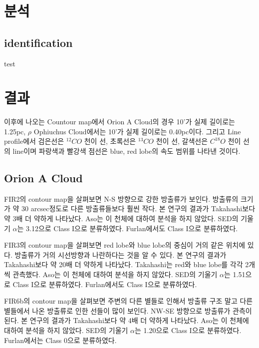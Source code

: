 \section{분석}

\subsection{identification}

test


\section{결과}

이후에 나오는 Countour map에서 Orion A Cloud의 경우 10'가 실제 길이로는 1.25pc, $\rho$ Ophiuchus Cloud에서는 10'가 실제 길이로는 0.40pc이다. 그리고 Line profile에서 검은선은 $^{12}CO$ 천이 선, 초록선은 $^{13}CO$ 천이 선, 갈색선은 $C^{18}O$ 천이 선의 line이며 파랑색과 빨강색 점선은 blue, red lobe의 속도 범위를 나타낸 것이다.


\subsection{Orion A Cloud}



\clearpage
\newpage   
FIR2의 contour map을 살펴보면 N-S 방향으로 강한 방출류가 보인다. 방출류의 크기가 약 30 arcsec정도로 다른 방출류들보다 훨씬 작다. 본 연구의 결과가 Takahashi보다 약 3배 더 약하게 나타났다. Aso는 이 천체에 대하여 분석을 하지 않았다. SED의 기울기 $\alpha$는 3.12으로 Class I으로 분류하였다. Furlan에서도 Class I으로 분류하였다.\cite{HerschelFurlan} 

FIR3의 contour map을 살펴보면  red lobe와 blue lobe의 중심이 거의 같은 위치에 있다. 방출류가 거의 시선방향과 나란하다는 것을 알 수 있다. 본 연구의 결과가 Takahashi보다 약 20배 더 약하게 나타났다. Takahashi는 red와 blue lobe를 각각 2개씩 관측했다. Aso는 이 천체에 대하여 분석을 하지 않았다.  SED의 기울기 $\alpha$는 1.51으로 Class I으로 분류하였다. Furlan에서도 Class I으로 분류하였다.\cite{HerschelFurlan} 

FIR6b의 contour map을 살펴보면 주변의 다른 별들로 인해서 방출류 구조 말고 다른 별들에서 나온 방출류로 인한 선들이 많이 보인다. NW-SE 방향으로 방출류가 관측이 된다. 본 연구의 결과가 Takahashi보다 약 4배 더 약하게 나타났다. Aso는 이 천체에 대하여 분석을 하지 않았다. SED의 기울기 $\alpha$는 1.20으로 Class I으로 분류하였다. Furlan에서는 Class 0으로 분류하였다.\cite{HerschelFurlan} 


